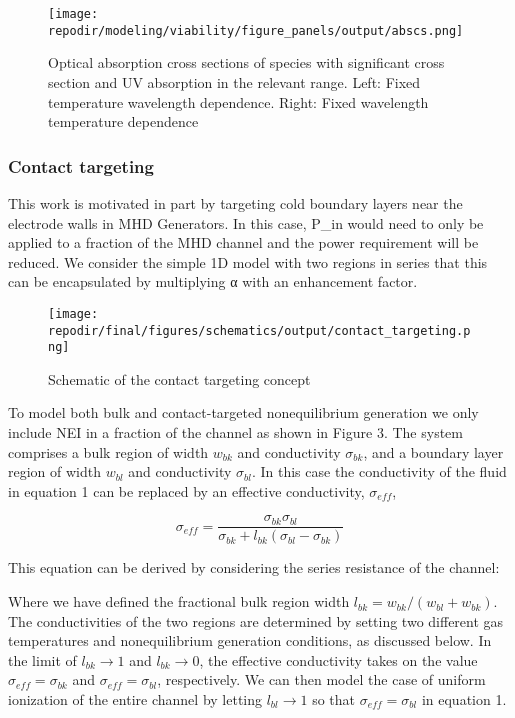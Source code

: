 \begin{figure}[h]
    \texttt{[image: \\repodir/modeling/viability/figure\_panels/output/abscs.png]} 
    \caption{Optical absorption cross sections of species with significant cross section and UV absorption in the relevant range. Left: Fixed temperature wavelength dependence. Right: Fixed wavelength temperature dependence}
    \label{fig:SI_UV_abscs}
\end{figure}


\subsubsection{Contact targeting}


This work is motivated in part by targeting cold boundary layers near the electrode walls in MHD Generators. In this case, P\_in would need to only be applied to a fraction of the MHD channel and the power requirement will be reduced. We consider the simple 1D model with two regions in series that this can be encapsulated by multiplying α with an enhancement factor.



\begin{figure}[h]
    \texttt{[image: \\repodir/final/figures/schematics/output/contact\_targeting.png]} 
    \caption{Schematic of the contact targeting concept}
    \label{fig:SI_contact_targeting_schematic}
\end{figure}


To model both bulk and contact-targeted nonequilibrium generation we only include NEI in a fraction of the channel as shown in Figure 3. The system comprises a bulk region of width $w_{bk}$ and conductivity $\sigma_{bk}$, and a boundary layer region of width $w_{bl}$ and conductivity $\sigma_{bl}$. In this case the conductivity of the fluid in equation 1 can be replaced by an effective conductivity, $\sigma_{eff}$, 

\[
\sigma_{eff}=\frac{\sigma_{bk} \sigma_{bl}}{\sigma_{bk}+l_{bk}  (\sigma_{bl}  -\sigma_{bk})}
\]

This equation can be derived by considering the series resistance of the channel:

Where we have defined the fractional bulk region width $l_{bk}=w_{bk}/(w_{bl}+w_{bk})$. The conductivities of the two regions are determined by setting two different gas temperatures and nonequilibrium generation conditions, as discussed below. In the limit of $l_{bk}\rightarrow1$ and $l_{bk}\rightarrow0$, the effective conductivity takes on the value $\sigma_{eff}= \sigma_{bk}$ and $\sigma_{eff}= \sigma_{bl}$, respectively. We can then model the case of uniform ionization of the entire channel by letting $l_{bl}\rightarrow1$ so that $\sigma_{eff}= \sigma_{bl}$ in equation 1. 

